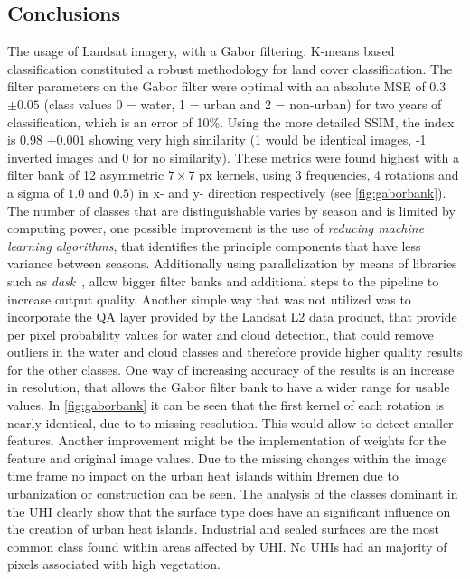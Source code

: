 \documentclass[12pt,a4paper, english,twoside]{scrartcl}
\begin{document}
 \subsection{Conclusions}

    The usage of Landsat imagery, with a Gabor filtering, K-means based classification constituted a robust methodology for land cover classification.
    The filter parameters on the Gabor filter were optimal with an absolute MSE of 0.3 $\pm 0.05$ (class values 0 = water, 1 = urban and 2 = non-urban) for two years of classification, which is an error of 10\%.
    Using the more detailed \gls{SSIM}, the index is 0.98 $\pm 0.001$ showing very high similarity (1 would be identical images, -1 inverted images and 0 for no similarity). 
    These metrics were found highest with a filter bank of 12 asymmetric $7\times7$ px kernels, using 3 frequencies, 4 rotations and a sigma of $1.0$ and $0.5)$ in x- and y- direction respectively (see \cref{fig:gaborbank}).
    The number of classes that are distinguishable varies by season and is limited by computing power, one possible improvement is the use of \textit{reducing machine learning algorithms}, that identifies the principle components that have less variance between seasons.
    Additionally using parallelization by means of libraries such as \textit{dask}~\autocite{dask}, allow bigger filter banks and additional steps to the pipeline to increase output quality.
    Another simple way that was not utilized was to incorporate the QA layer provided by the Landsat L2 data product, that provide per pixel probability values for water and cloud detection, that could remove outliers in the water and cloud classes and therefore provide higher quality results for the other classes. 
    One way of increasing accuracy of the results is an increase in resolution, that allows the Gabor filter bank to have a wider range for usable values. 
    In \cref{fig:gaborbank} it can be seen that the first kernel of each rotation is nearly identical, due to to missing resolution. 
    This would allow to detect smaller features.
    Another improvement might be the implementation of weights for the feature and original image values.
    Due to the missing changes within the image time frame no impact on the urban heat islands within Bremen due to urbanization or construction can be seen. 
    The analysis of the classes dominant in the \gls{UHI} clearly show that the surface type does have an significant influence on the creation of urban heat islands. 
    Industrial and sealed surfaces are the most common class found within areas affected by \gls{UHI}.
    No \glspl{UHI} had an majority of pixels associated with high vegetation. 
    
\end{document}
